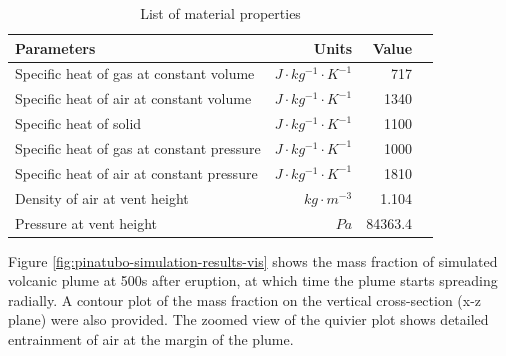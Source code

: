 \documentclass[gmd, manuscript]{copernicus}
\begin{document}
\begin{table}[htp]
	\begin{centering}
      \caption{List of material properties}		
	  \begin{tabular}{lrrr}
	    \hline
	    Parameters & Units  & Value \\
	    \hline
	    	Specific heat of gas at constant volume     & $J \cdot kg^{-1}\cdot K^{-1}$& 717     \\
	    Specific heat of air at constant volume     & $J \cdot kg^{-1}\cdot K^{-1}$& 1340    \\
	    	Specific heat of solid                      & $J \cdot kg^{-1}\cdot K^{-1}$& 1100    \\
	    	Specific heat of gas at constant pressure   & $J \cdot kg^{-1}\cdot K^{-1}$& 1000    \\
	    	Specific heat of air at constant pressure   & $J \cdot kg^{-1}\cdot K^{-1}$& 1810    \\
	    	Density of air at vent height               & $kg \cdot m^{-3}$       & 1.104   \\
	    Pressure at vent height                        & $Pa$              & 84363.4 \\
	    \hline
	  \end{tabular}
	  \label{tab:material_properties}
	\end{centering}
\end{table}

Figure \ref{fig:pinatubo-simulation-results-vis} shows the mass fraction of simulated volcanic plume at 500s after eruption, at which time the plume starts spreading radially. A contour plot of the mass fraction on the vertical cross-section (x-z plane) were also provided. The zoomed view of the quivier plot shows detailed entrainment of air at the margin of the plume.
\end{document}
